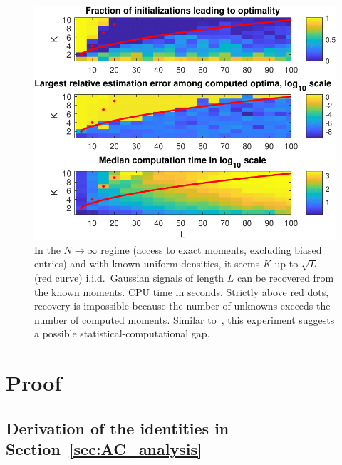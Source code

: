 \documentclass[12pt]{article}
\newcommand{\1}{\mathbf{1}}
\theoremstyle{plain}
\theoremstyle{definition}
\theoremstyle{remark}
\theoremstyle{plain}
\theoremstyle{remark}
\theoremstyle{plain}
\theoremstyle{plain}
\theoremstyle{plain}
\numberwithin{equation}{section}
\begin{document}
\begin{figure}[t]
	\centering
	\includegraphics[width=.7\linewidth]{KLXP/XP1}
	\caption{In the $N \to \infty$ regime (access to exact moments, excluding biased entries) and with known uniform densities, it seems $K$ up to $\sqrt{L}$ (red curve) i.i.d.\ Gaussian signals of length $L$ can be recovered from the known moments. CPU time in seconds. Strictly above red dots, recovery is impossible because the number of unknowns exceeds the number of computed moments. Similar to~\cite[Fig.~4.1]{boumal2017heterogeneous}, this experiment suggests a possible statistical-computational gap.}
	\label{fig:KLXP}
\end{figure}



\section{Proof}

\subsection{Derivation of the identities in Section~\ref{sec:AC_analysis}} \label{sec:autocorrelation_computation}
\end{document}

